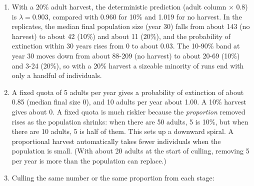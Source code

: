 \documentclass[
  a4paper]{book}
\providecommand{\tightlist}{%
  \setlength{\itemsep}{0pt}\setlength{\parskip}{0pt}}
\begin{document}
\begin{enumerate}
\def\labelenumi{\arabic{enumi}.}
\tightlist
\item
  With a 20\% adult harvest, the deterministic prediction (adult column × 0.8) is \(\lambda = 0.903\), compared with 0.960 for 10\% and 1.019 for no harvest. In the replicates, the median final population size (year 30) falls from about 143 (no harvest) to about 42 (10\%) and about 11 (20\%), and the probability of extinction within 30 years rises from 0 to about 0.03. The 10-90\% band at year 30 moves down from about 88-209 (no harvest) to about 20-69 (10\%) and 3-24 (20\%), so with a 20\% harvest a sizeable minority of runs end with only a handful of individuals.
\item
  A fixed quota of 5 adults per year gives a probability of extinction of about 0.85 (median final size 0), and 10 adults per year about 1.00. A 10\% harvest gives about 0. A fixed quota is much riskier because the \emph{proportion} removed rises as the population shrinks: when there are 50 adults, 5 is 10\%, but when there are 10 adults, 5 is half of them. This sets up a downward spiral. A proportional harvest automatically takes fewer individuals when the population is small. (With about 20 adults at the start of culling, removing 5 per year is more than the population can replace.)
\item
  Culling the same number or the same proportion from each stage:
\end{enumerate}
\end{document}
